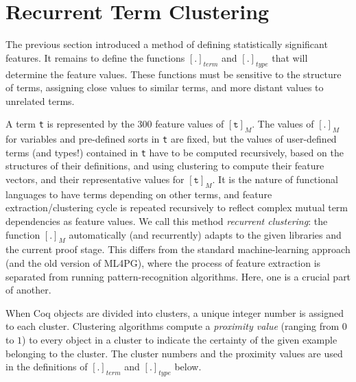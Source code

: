 \section{Recurrent Term Clustering}\label{sec:reclemmaclustering}

The previous section introduced a method of defining statistically significant features.
It remains to define the functions
 $[.]_{term}$ and $[.]_{type}$ that will determine the feature values.
These functions must be sensitive to the structure of terms, assigning close values
to similar terms, and more distant values to unrelated terms.

A term \lstinline?t? is represented by the $300$ feature values of $[\texttt{t}]_M$.
The values of $[.]_{M}$
for  variables  and pre-defined sorts in \lstinline?t? are fixed, but the values of user-defined terms (and types!) contained in \texttt{t}
have to be computed recursively, based
on the structures of their definitions, and
using clustering to compute their feature vectors, and their representative values for $[\texttt{t}]_M$.
It is the nature of functional languages to have terms depending on other terms, and feature extraction/clustering cycle is
repeated recursively to reflect complex mutual term dependencies as feature values.
 We call this method \emph{recurrent clustering}: the function $[.]_M$ automatically (and recurrently) adapts to the given libraries and the current proof stage.
This differs from the standard machine-learning approach (and the old version of ML4PG), where the process of feature extraction is separated from running pattern-recognition algorithms. Here, one is a crucial part of another.



When Coq objects are divided into clusters, a unique integer number is assigned to each cluster. Clustering algorithms compute
a \emph{proximity value} (ranging from $0$ to $1$) to every object in a cluster to indicate the certainty of the given example belonging
to the cluster. The cluster numbers and the proximity values are used in the definitions of $[.]_{term}$ and $[.]_{type}$ below.


